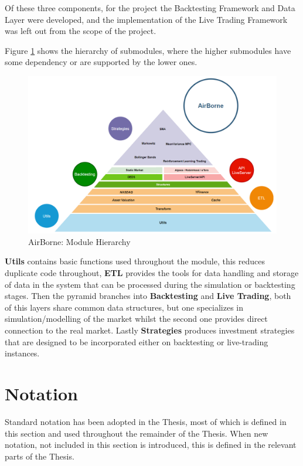 Of these three components, for the project the Backtesting Framework and Data Layer were developed, and the implementation of the Live Trading Framework was left out from the scope of the project.

Figure \ref{fig::AirBorneModules} shows the hierarchy of submodules, where the higher submodules have some dependency or are supported by the lower ones.

\begin{figure}[h!]
    \centering
    \includegraphics[width=1\textwidth]{imgs/ch1/Hierarchy.png}
    \caption[AirBorne: Module Hierarchy]{AirBorne: Module Hierarchy}
    \label{fig::AirBorneModules}
\end{figure}

\textbf{Utils} contains basic functions used throughout the module, this reduces duplicate code throughout, \textbf{ETL} provides the tools for data handling and storage of data in the system that can be processed during the simulation or backtesting stages. Then the pyramid branches into \textbf{Backtesting} and \textbf{Live Trading}, both of this layers share common data structures, but one specializes in simulation/modelling of the market whilst the second one provides direct connection to the real market. Lastly \textbf{Strategies} produces investment strategies that are designed to be incorporated either on backtesting or live-trading instances.


\section{Notation}

Standard notation has been adopted in the Thesis, most of which is defined in this section and used throughout the remainder of the Thesis. When new notation, not included in this section is introduced, this is defined in the relevant parts of the Thesis.\smallskip\\

